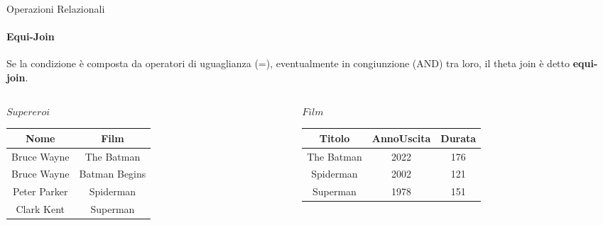     \begin{frame}{Operazioni Relazionali}
        \framesubtitle{Equi-Join}
        Se la condizione \`e composta da operatori di uguaglianza (=), eventualmente in congiunzione (AND) tra loro, il theta join \`e detto \textbf{equi-join}.
        \begin{columns}
            \begin{column}{0.48\textwidth}
                \centering
                {\small $Supereroi$}
                \newline
        \begin{tabular}{|c|c|}
            \hline
            \rowcolor{cyan!30}Nome & Film \\
            \hline
            Bruce Wayne & The Batman \\ \hline
            Bruce Wayne & Batman Begins \\ \hline
            Peter Parker & Spiderman \\ \hline
            Clark Kent & Superman\\ \hline
            \end{tabular}
            \end{column}
            \begin{column}{0.48\textwidth}
                \centering
                {\small $Film$}
                \newline
                \begin{tabular}{|c|c|c|}
                    \hline
                    \rowcolor{cyan!30} Titolo & AnnoUscita & Durata \\ \hline
                    The Batman & 2022 & 176 \\ \hline
                    Spiderman & 2002 & 121 \\ \hline
                    Superman & 1978 & 151 \\ \hline
                    \end{tabular}
            \end{column}
        \end{columns}
    \end{frame}
